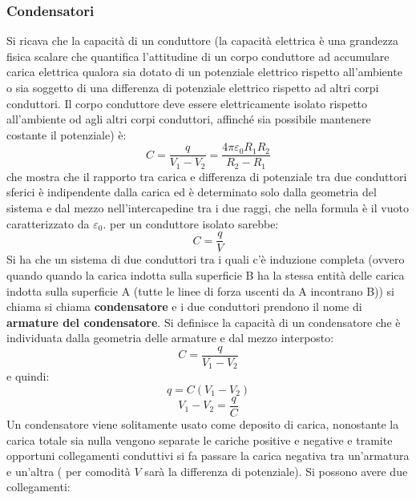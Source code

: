\documentclass[a4paper,12pt, oneside]{book}
\begin{document}
\subsubsection{Condensatori}
Si ricava che la capacità di un conduttore (la capacità elettrica è una grandezza fisica scalare che quantifica l'attitudine di un corpo conduttore ad accumulare carica elettrica qualora sia dotato di un potenziale elettrico rispetto all'ambiente o sia soggetto di una differenza di potenziale elettrico rispetto ad altri corpi conduttori.  Il corpo conduttore deve essere elettricamente isolato rispetto all'ambiente od agli altri corpi conduttori, affinché sia possibile mantenere costante il potenziale) è:
$$C=\frac{q}{V_1-V_2}=\frac{4\pi\varepsilon_0R_1R_2}{R_2-R_1}$$
che mostra che il rapporto tra carica e differenza di potenziale tra due conduttori sferici è indipendente dalla carica ed è determinato solo dalla geometria del sistema e dal mezzo nell'intercapedine tra i due raggi, che nella formula è il vuoto caratterizzato da $\varepsilon_0$.
per un conduttore isolato sarebbe:
$$C=\frac{q}{V}$$
Si ha che un sistema di due conduttori tra i quali c'è induzione completa (ovvero quando quando la carica indotta sulla superficie B ha la stessa entità delle carica indotta sulla superficie A (tutte le linee di forza uscenti da A incontrano B)) si chiama si chiama \textbf{condensatore} e i due conduttori prendono il nome di \textbf{armature del condensatore}. Si definisce la capacità di un condensatore che è individuata dalla geometria delle armature e dal mezzo interposto:
$$C=\frac{q}{V_1-V_2}$$
e quindi:
$$q=C(V_1-V_2)$$
$$V_1-V_2=\frac{q}{C}$$
Un condensatore viene solitamente usato come deposito di carica, nonostante la carica totale sia nulla vengono separate le cariche positive e negative e tramite opportuni collegamenti conduttivi si fa passare la carica negativa tra un'armatura e un'altra ( per comodità $V$ sarà la differenza di potenziale). Si possono avere due collegamenti:
\end{document}
